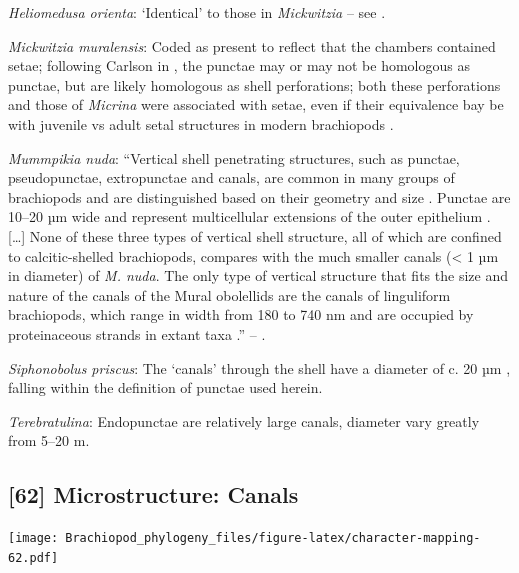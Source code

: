 \documentclass[openany]{book}
\theoremstyle{definition}
\theoremstyle{definition}
\theoremstyle{definition}
\theoremstyle{remark}
\begin{document}
\hypertarget{Heliomedusa_orienta-coding-61}{}
\emph{Heliomedusa orienta}: `Identical' to those in \emph{Mickwitzia} --
see \citet{Williams2007Supplement}.

\hypertarget{Mickwitzia_muralensis-coding-61}{}
\emph{Mickwitzia muralensis}: Coded as present to reflect that the
chambers contained setae; following Carlson in
\citet{Williams2007Supplement}, the punctae may or may not be homologous
as punctae, but are likely homologous as shell perforations; both these
perforations and those of \emph{Micrina} were associated with setae,
even if their equivalence bay be with juvenile vs adult setal structures
in modern brachiopods \citep[p.~397]{Balthasar2004Shellstructure}.

\hypertarget{Mummpikia_nuda-coding-61}{}
\emph{Mummpikia nuda}: ``Vertical shell penetrating structures, such as
punctae, pseudopunctae, extropunctae and canals, are common in many
groups of brachiopods and are distinguished based on their geometry and
size \citep{Williams1997Introduction}. Punctae are 10--20 µm wide and
represent multicellular extensions of the outer epithelium
\citep{Owen1969Thecaecum}. {[}\ldots{}{]} None of these three types of
vertical shell structure, all of which are confined to calcitic-shelled
brachiopods, compares with the much smaller canals (\textless{} 1 µm in
diameter) of \emph{M. nuda}. The only type of vertical structure that
fits the size and nature of the canals of the Mural obolellids are the
canals of linguliform brachiopods, which range in width from 180 to 740
nm and are occupied by proteinaceous strands in extant taxa
\citetext{\citealp[1994]{Williams1992Structureof}; \citealp{Williams1997Introduction}}.''
-- \citet{Balthasar2008iMummpikia}.

\hypertarget{Siphonobolus_priscus-coding-61}{}
\emph{Siphonobolus priscus}: The `canals' through the shell have a
diameter of c. 20 µm \citep[text-fig. 2a]{Williams2004Chemicostructure},
falling within the definition of punctae used herein.

\hypertarget{Terebratulina-coding-61}{}
\emph{Terebratulina}: Endopunctae are relatively large canals, diameter
vary greatly from 5--20 m.

\subsection*{{[}62{]} Microstructure:
Canals}\label{microstructure-canals}

\texttt{[image: Brachiopod\_phylogeny\_files/figure-latex/character-mapping-62.pdf]}
\end{document}
